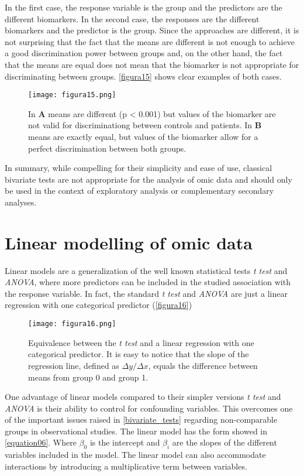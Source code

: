In the first case, the response variable is the group and the predictors are the different biomarkers. In the second case, the responses are the different biomarkers and the predictor is the group. Since the approaches are different, it is not surprising that the fact that the means are different is not enough to achieve a good discrimination power between groups and, on the other hand, the fact that the means are equal does not mean that the biomarker is not appropriate for discriminating between groups. \autoref{figura15} shows clear examples of both cases.

\begin{figure}[hbtp]
	\centering
\texttt{[image: figura15.png]}
\caption{In \textbf{A} means are different (p < 0.001) but values of the biomarker are not valid for discriminationg between controls and patients. In \textbf{B} means are exactly equal, but values of the biomarker allow for a perfect discrimination between both groups.}
\label{figura15}
\end{figure}

In summary, while compelling for their simplicity and ease of use, classical bivariate tests are not appropriate for the analysis of omic data and should only be used in the context of exploratory analysis or complementary secondary analyses.

\section{Linear modelling of omic data}
\label{linearmodels}
Linear models are a generalization of the well known statistical tests \textit{t test} and \textit{ANOVA}, where more predictors can be included in the studied association with the response variable. In fact, the standard \textit{t test} and \textit{ANOVA} are just a linear regression with one categorical predictor (\autoref{figura16})

\begin{figure}[hbtp]
	\centering
\texttt{[image: figura16.png]}
\caption{Equivalence between the \textit{t test} and a linear regression with one categorical predictor. It is easy to notice that the slope of the regression line, defined as $\Delta y/\Delta x$, equals the difference between means from group 0 and group 1.}
\label{figura16}
\end{figure}

One advantage of linear models compared to their simpler versions \textit{t test} and \textit{ANOVA} is their ability to control for confounding variables. This overcomes one of the important issues raised in \autoref{bivariate_tests} regarding non-comparable groups in observational studies. The linear model has the form showed in \autoref{equation06}. Where $\beta_0$ is the intercept and $\beta_i$ are the slopes of the different variables included in the model. The linear model can also accommodate interactions by introducing a multiplicative term between variables.

